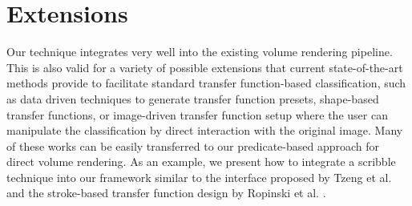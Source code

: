 \section*{Extensions}

Our technique integrates very well into the existing volume rendering pipeline. 
This is also valid for a variety of possible extensions that current state-of-the-art methods provide to facilitate standard transfer function-based classification, such as data driven techniques to generate transfer function presets, shape-based transfer functions, or image-driven transfer function setup where the user can manipulate the classification by direct interaction with the original image. 
Many of these works can be easily transferred to our predicate-based approach for direct volume rendering. 
As an example, we present how to integrate a scribble technique into our framework similar to the interface proposed by Tzeng et al. \cite{Tzeng03} and the stroke-based transfer function design by Ropinski et al. \cite{Ropinski08}. 

